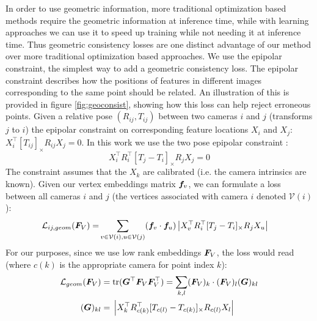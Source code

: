 \documentclass{article} %
\newcommand{\cross}[1]{[#1]_{\times}}
\begin{document}
In order to use geometric information, more traditional optimization based methods require the geometric information at inference time, while with learning approaches we can use it to speed up training while not needing it at inference time.
Thus geometric consistency losses are one distinct advantage of our method over more traditional optimization based approaches.
We use the epipolar constraint, the simplest way to add a geometric consistency loss.
The epipolar constraint describes how the positions of features in different images corresponding to the same point should be related.
An illustration of this is provided in figure \ref{fig:geoconsist}, showing how this loss can help reject erroneous points.
Given a relative pose $(R_{ij}, T_{ij})$ between two cameras $i$ and $j$  (transforms $j$ to $i$) the epipolar constraint on corresponding feature locations $X_i$ and $X_j$: $X_{i}^\top \cross{T_{ij}}R_{ij} X_{j} = 0$.
In this work we use the two pose epipolar constraint \citep{tron2014quotient}:
\begin{equation}
X_{i}^\top R_{i}^\top \cross{T_{j} - T_{i}}R_{j} X_{j} = 0
\label{eq:essential_constraint}
\end{equation}
The constraint assumes that the $X_k$ are calibrated (i.e. the camera intrinsics are known). 
Given our vertex embeddings matrix ${\bm{f}}_v$, we can formulate a loss between all cameras $i$ and $j$ (the vertices associated with camera $i$ denoted $\mathcal{V}(i)$):
\begin{align}
\mathcal{L}_{ij,geom}(\mF_V) = 
&\sum_{v \in \mathcal{V}(i),u \in \mathcal{V}(j)} (\vf_v \cdot \vf_u) \left|X_{v}^\top R_{i}^\top \cross{T_{j} - T_{i}}R_{j} X_{u}\right|
\label{eq:geom_cost}
\end{align}
For our purposes, since we use low rank embeddings ${\bm{F}}_{V}$, the loss would read (where $c(k)$ is the appropriate camera for point index $k$):
\begin{align} 
\mathcal{L}_{geom}(\mF_V)
=&\; \mathrm{tr}(\mG^\top \mF_V\mF_V^\top) = \sum_{k,l} (\mF_V)_{k} \cdot (\mF_V)_{l} (\mG)_{kl} \label{eq:geom_cost2} \\
(\mG)_{kl} =&\; \left|X_{k}^\top R_{c(k)}^\top \cross{T_{c(l)} - T_{c(k)}}R_{c(l)} X_{l}\right| \nonumber
\end{align}
\end{document}
